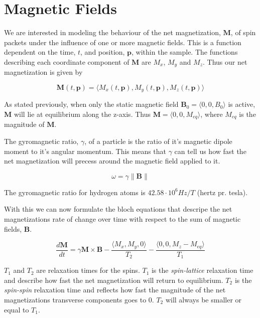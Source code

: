 \section{Magnetic Fields}


We are interested in modeling the behaviour of the net magnetization,
$\textbf{M}$, of spin packets under the influence of one or more
magnetic fields. This is a function dependent on the time, $t$, and
position, $\textbf{p}$, within the sample. The functions describing
each coordinate component of $\textbf{M}$ are $M_x$, $M_y$ and
$M_z$. Thus our net magnetization is given by

\begin{displaymath}
  \textbf{M}(t, \textbf{p}) = \langle M_x(t, \textbf{p}), M_y(t, \textbf{p}), M_z(t, \textbf{p}) \rangle
\end{displaymath}

As stated previously, when only the static magnetic field
$\mathbf{B}_0 = \langle 0, 0, B_0 \rangle$ is active, $\textbf{M}$
will lie at equilibrium along the z-axis. Thus $\textbf{M} = \langle
0, 0, M_{eq} \rangle$, where $M_{eq}$ is the magnitude of $\textbf{M}$.

The gyromagnetic ratio, $\gamma$, of a particle is the ratio of it's
magnetic dipole moment to it's angular momentum. This means that
$\gamma$ can tell us how fast the net magnetization will precess
around the magnetic field applied to it. 

\begin{displaymath}
  \omega = \gamma \| \mathbf{B} \|
\end{displaymath}

The gyromagnetic ratio for hydrogen atoms is $42.58 \cdot 10^6 Hz  / T$
(hertz pr. tesla).

With this we can now formulate the bloch equations that descripe the
net magnetizations rate of change over time with respect to the sum of
magnetic fields, $\mathbf{B}$.

\begin{displaymath}
  \frac{d\mathbf{M}}{dt} = \gamma \mathbf{M} \times \mathbf{B} -
  \frac{\langle M_x, M_y, 0 \rangle}{T_2} - \frac{\langle 0, 0, M_z -
    M_{eq} \rangle}{T_1}
\end{displaymath}

$T_1$ and $T_2$ are relaxation times for the spins. $T_1$ is the
\textit{spin-lattice} relaxation time and describe how fast the net
magnetization will return to equilibrium. $T_2$ is the
\textit{spin-spin} relaxation time and reflects how fast the magnitude
of the net magnetizations transverse components goes to 0. $T_2$ will
always be smaller or equal to $T_1$.

